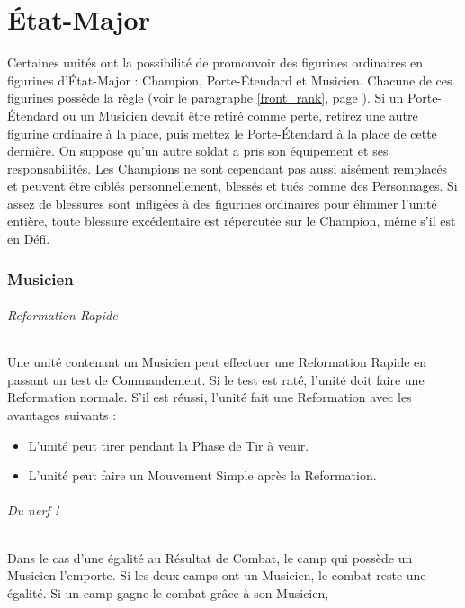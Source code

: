 
\part{État-Major}
\label{command_group}

Certaines unités ont la possibilité de promouvoir des figurines ordinaires en figurines d'État-Major : Champion, Porte-Étendard et Musicien. Chacune de ces figurines possède la règle \newfromWHB{\frontrank} (voir le paragraphe \ref{front_rank}, page \pageref{front_rank}). Si un Porte-Étendard ou un Musicien devait être retiré comme perte, retirez une autre figurine ordinaire à la place, puis mettez le Porte-Étendard à la place de cette dernière. On suppose qu'un autre soldat a pris son équipement et ses responsabilités. Les Champions ne sont cependant pas aussi aisément remplacés et peuvent être ciblés personnellement, blessés et tués comme des Personnages. Si assez de blessures sont infligées à des figurines ordinaires pour éliminer l'unité entière, toute blessure excédentaire est répercutée sur le Champion, même s'il est en Défi.

\section{Musicien}
\label{musician}

\paragraph{Reformation Rapide}

Une unité contenant un Musicien peut effectuer une Reformation Rapide en passant un test de Commandement. Si le test est raté, l'unité doit faire une Reformation normale. S'il est réussi, l'unité fait une Reformation avec les avantages suivants :
\begin{itemize}[label={-}]
\item L'unité peut tirer pendant la Phase de Tir à venir.
\item L'unité peut faire un Mouvement Simple après la Reformation.
\end{itemize}

\paragraph{Du nerf !}

Dans le cas d'une égalité au Résultat de Combat, le camp qui possède un Musicien l'emporte. Si les deux camps ont un Musicien, le combat reste une égalité. Si un camp gagne le combat grâce à son Musicien, 

